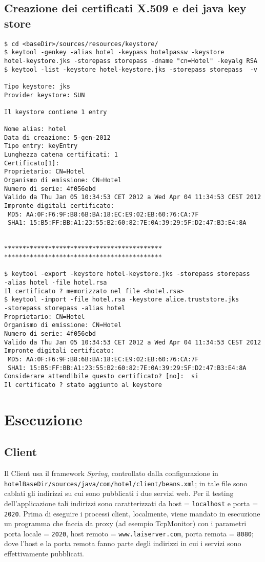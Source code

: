 \subsection{Creazione dei certificati X.509 e dei java key store}
\begin{verbatim}
$ cd <baseDir>/sources/resources/keystore/
$ keytool -genkey -alias hotel -keypass hotelpassw -keystore
hotel-keystore.jks -storepass storepass -dname "cn=Hotel" -keyalg RSA
$ keytool -list -keystore hotel-keystore.jks -storepass storepass  -v

Tipo keystore: jks
Provider keystore: SUN

Il keystore contiene 1 entry

Nome alias: hotel
Data di creazione: 5-gen-2012
Tipo entry: keyEntry
Lunghezza catena certificati: 1
Certificato[1]:
Proprietario: CN=Hotel
Organismo di emissione: CN=Hotel
Numero di serie: 4f056ebd
Valido da Thu Jan 05 10:34:53 CET 2012 a Wed Apr 04 11:34:53 CEST 2012
Impronte digitali certificato:
 MD5: AA:0F:F6:9F:B8:6B:BA:18:EC:E9:02:EB:60:76:CA:7F
 SHA1: 15:B5:FF:BB:A1:23:55:B2:60:82:7E:0A:39:29:5F:D2:47:B3:E4:8A


*******************************************
*******************************************

$ keytool -export -keystore hotel-keystore.jks -storepass storepass
-alias hotel -file hotel.rsa
Il certificato ? memorizzato nel file <hotel.rsa>
$ keytool -import -file hotel.rsa -keystore alice.truststore.jks
-storepass storepass -alias hotel
Proprietario: CN=Hotel
Organismo di emissione: CN=Hotel
Numero di serie: 4f056ebd
Valido da Thu Jan 05 10:34:53 CET 2012 a Wed Apr 04 11:34:53 CEST 2012
Impronte digitali certificato:
 MD5: AA:0F:F6:9F:B8:6B:BA:18:EC:E9:02:EB:60:76:CA:7F
 SHA1: 15:B5:FF:BB:A1:23:55:B2:60:82:7E:0A:39:29:5F:D2:47:B3:E4:8A
Considerare attendibile questo certificato? [no]:  si
Il certificato ? stato aggiunto al keystore
\end{verbatim}


\section{Esecuzione}
\subsection{Client}
Il Client usa il framework \emph{Spring}, controllato dalla
configurazione in
\verb'hotelBaseDir/sources/'\-\verb'java/com/hotel/client/beans.xml'; in
tale file sono cablati gli indirizzi su cui sono pubblicati i due
servizi web. Per il testing dell'applicazione tali indirizzi sono
caratterizzati da host = \verb'localhost' e porta = \verb'2020'. Prima
di eseguire i processi client, localmente, viene mandato in esecuzione
un programma che faccia da proxy (ad esempio TcpMonitor) con i
parametri porta locale = \verb'2020', host remoto =
\verb'www.laiserver.com', porta remota = \verb'8080'; dove l'host e la
porta remota fanno parte degli indirizzi in cui i servizi sono
effettivamente pubblicati.

